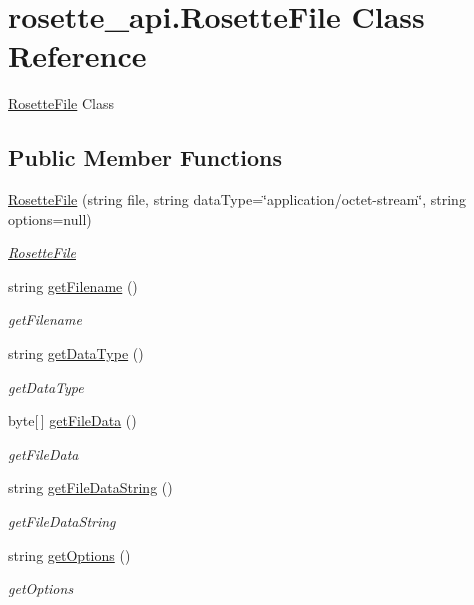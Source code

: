 \hypertarget{classrosette__api_1_1_rosette_file}{}\section{rosette\+\_\+api.\+Rosette\+File Class Reference}
\label{classrosette__api_1_1_rosette_file}


\hyperlink{classrosette__api_1_1_rosette_file}{Rosette\+File} Class  


\subsection*{Public Member Functions}
\begin{DoxyCompactItemize}
\item 
\hyperlink{classrosette__api_1_1_rosette_file_a979c8781846391dc237697e09423f472}{Rosette\+File} (string file, string data\+Type=\char`\"{}application/octet-\/stream\char`\"{}, string options=null)
\begin{DoxyCompactList}\small\item\em \hyperlink{classrosette__api_1_1_rosette_file}{Rosette\+File} \end{DoxyCompactList}\item 
string \hyperlink{classrosette__api_1_1_rosette_file_a92c60183e27f079750855b3aae00c58b}{get\+Filename} ()
\begin{DoxyCompactList}\small\item\em get\+Filename \end{DoxyCompactList}\item 
string \hyperlink{classrosette__api_1_1_rosette_file_af539cca8d69c0b71e46baed02987b3dc}{get\+Data\+Type} ()
\begin{DoxyCompactList}\small\item\em get\+Data\+Type \end{DoxyCompactList}\item 
byte\mbox{[}$\,$\mbox{]} \hyperlink{classrosette__api_1_1_rosette_file_a27511cf013b4cec685fe38cf8f6aa4d8}{get\+File\+Data} ()
\begin{DoxyCompactList}\small\item\em get\+File\+Data \end{DoxyCompactList}\item 
string \hyperlink{classrosette__api_1_1_rosette_file_aa7022b54ae4f9e6f42b66c0f6e0a6ad6}{get\+File\+Data\+String} ()
\begin{DoxyCompactList}\small\item\em get\+File\+Data\+String \end{DoxyCompactList}\item 
string \hyperlink{classrosette__api_1_1_rosette_file_add8db1d7668066dfcf4c7244fe791ed8}{get\+Options} ()
\begin{DoxyCompactList}\small\item\em get\+Options \end{DoxyCompactList}\end{DoxyCompactItemize}



